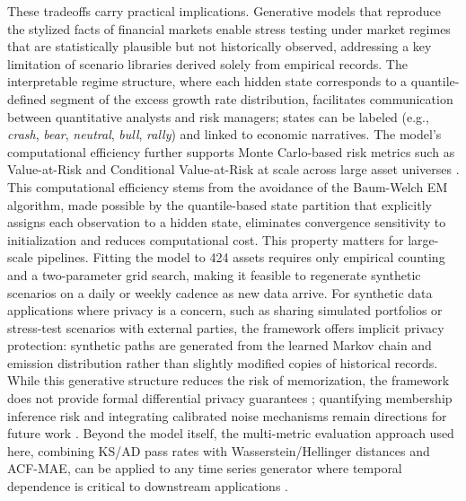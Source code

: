 These tradeoffs carry practical implications. Generative models that reproduce the stylized facts of financial markets enable stress testing under market regimes that are statistically plausible but not historically observed, addressing a key limitation of scenario libraries derived solely from empirical records. The interpretable regime structure, where each hidden state corresponds to a quantile-defined segment of the excess growth rate distribution, facilitates communication between quantitative analysts and risk managers; states can be labeled (e.g., \textit{crash}, \textit{bear}, \textit{neutral}, \textit{bull}, \textit{rally}) and linked to economic narratives. The model's computational efficiency further supports Monte Carlo-based risk metrics such as Value-at-Risk and Conditional Value-at-Risk at scale across large asset universes \cite{glasserman_monte_2003}. This computational efficiency stems from the avoidance of the Baum-Welch EM algorithm, made possible by the quantile-based state partition that explicitly assigns each observation to a hidden state, eliminates convergence sensitivity to initialization and reduces computational cost. This property matters for large-scale pipelines. Fitting the model to 424 assets requires only empirical counting and a two-parameter grid search, making it feasible to regenerate synthetic scenarios on a daily or weekly cadence as new data arrive. For synthetic data applications where privacy is a concern, such as sharing simulated portfolios or stress-test scenarios with external parties, the framework offers implicit privacy protection: synthetic paths are generated from the learned Markov chain and emission distribution rather than slightly modified copies of historical records. While this generative structure reduces the risk of memorization, the framework does not provide formal differential privacy guarantees \cite{dwork_differential_2006}; quantifying membership inference risk and integrating calibrated noise mechanisms remain directions for future work \cite{stadler_synthetic_2022}. Beyond the model itself, the multi-metric evaluation approach used here, combining KS/AD pass rates with Wasserstein/Hellinger distances and ACF-MAE, can be applied to any time series generator where temporal dependence is critical to downstream applications \cite{stenger_jdiq_ts_synthesis_2024}.

